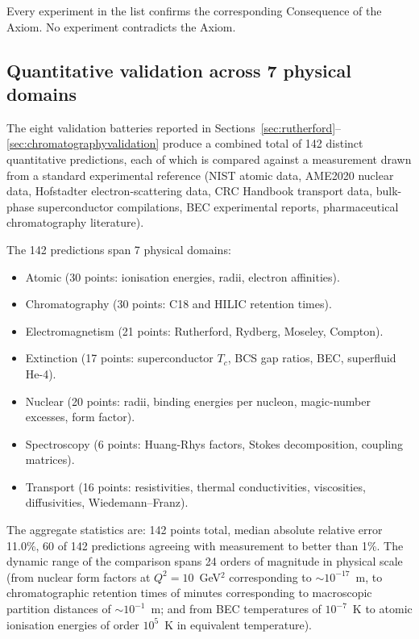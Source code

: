\documentclass[11pt,twocolumn,a4paper]{article}
\theoremstyle{axiomstyle}
\theoremstyle{conseqstyle}
\theoremstyle{definition}
\theoremstyle{remark}
\begin{document}
Every experiment in the list confirms the corresponding Consequence of the Axiom. No experiment contradicts the Axiom.



\subsection{Quantitative validation across 7 physical domains}

The eight validation batteries reported in Sections~\ref{sec:rutherford}--\ref{sec:chromatographyvalidation} produce a combined total of 142 distinct quantitative predictions, each of which is compared against a measurement drawn from a standard experimental reference (NIST atomic data, AME2020 nuclear data, Hofstadter electron-scattering data, CRC Handbook transport data, bulk-phase superconductor compilations, BEC experimental reports, pharmaceutical chromatography literature).

The 142 predictions span 7 physical domains:
\begin{itemize}
\item Atomic (30 points: ionisation energies, radii, electron affinities).
\item Chromatography (30 points: C18 and HILIC retention times).
\item Electromagnetism (21 points: Rutherford, Rydberg, Moseley, Compton).
\item Extinction (17 points: superconductor $T_c$, BCS gap ratios, BEC, superfluid He-4).
\item Nuclear (20 points: radii, binding energies per nucleon, magic-number excesses, form factor).
\item Spectroscopy (6 points: Huang-Rhys factors, Stokes decomposition, coupling matrices).
\item Transport (16 points: resistivities, thermal conductivities, viscosities, diffusivities, Wiedemann--Franz).
\end{itemize}

The aggregate statistics are: 142 points total, median absolute relative error 11.0\%, 60 of 142 predictions agreeing with measurement to better than 1\%. The dynamic range of the comparison spans 24 orders of magnitude in physical scale (from nuclear form factors at $Q^2=10$~GeV$^2$ corresponding to $\sim 10^{-17}$~m, to chromatographic retention times of minutes corresponding to macroscopic partition distances of $\sim 10^{-1}$~m; and from BEC temperatures of $10^{-7}$~K to atomic ionisation energies of order $10^{5}$~K in equivalent temperature).
\end{document}
